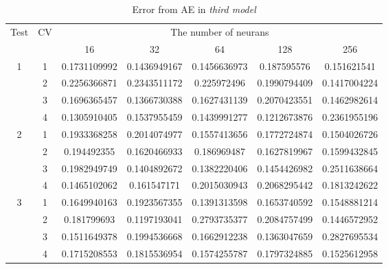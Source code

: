 \documentclass[draft,dvipsnames]{drexel-thesis}
\begin{document}
\begin{thesis}
\begin{table}[!t]
\centering
\caption{Error from AE in {\em third model}}
\label{tbl:mae_error}
\begin{tabular}{|c|c|c|c|c|c|c|}
\hline
\multirow{2}{*}{Test} & \multirow{2}{*}{CV} & \multicolumn{5}{c|}{The number of neurans}                                   \\ \cline{3-7}
                      &                     & 16           & 32            & 64            & 128           & 256           \\ \hline
\multirow{4}{*}{1}    & 1                   & 0.1731109992 & 0.1436949167  & 0.1456636973  & 0.187595576   & 0.151621541   \\ \cline{2-7}
                      & 2                   & 0.2256366871 & 0.2343511172  & 0.225972496   & 0.1990794409  & 0.1417004224  \\ \cline{2-7}
                      & 3                   & 0.1696365457 & 0.1366730388  & 0.1627431139  & 0.2070423551  & 0.1462982614  \\ \cline{2-7}
                      & 4                   & 0.1305910405 & 0.1537955459  & 0.1439991277  & 0.1212673876  & 0.2361955196  \\ \hline
\multirow{4}{*}{2}    & 1                   & 0.1933368258 & 0.2014074977  & 0.1557413656  & 0.1772724874  & 0.1504026726  \\ \cline{2-7}
                      & 2                   & 0.194492355  & 0.1620466933  & 0.186969487   & 0.1627819967  & 0.1599432845  \\ \cline{2-7}
                      & 3                   & 0.1982949749 & 0.1404892672  & 0.1382220406  & 0.1454426982  & 0.2511638664  \\ \cline{2-7}
                      & 4                   & 0.1465102062 & 0.161547171   & 0.2015030943  & 0.2068295442  & 0.1813242622  \\ \hline
\multirow{4}{*}{3}    & 1                   & 0.1649940163 & 0.1923567355  & 0.1391313598  & 0.1653740592  & 0.1548881214  \\ \cline{2-7}
                      & 2                   & 0.181799693  & 0.1197193041  & 0.2793735377  & 0.2084757499  & 0.1446572952  \\ \cline{2-7}
                      & 3                   & 0.1511649378 & 0.1994536668  & 0.1662912238  & 0.1363047659  & 0.2827695534  \\ \cline{2-7}
                      & 4                   & 0.1715208553 & 0.1815536954  & 0.1574255787  & 0.1797324885  & 0.1525612958  \\ \hline

\end{tabular}
\end{table}
\end{thesis}
\end{document}
